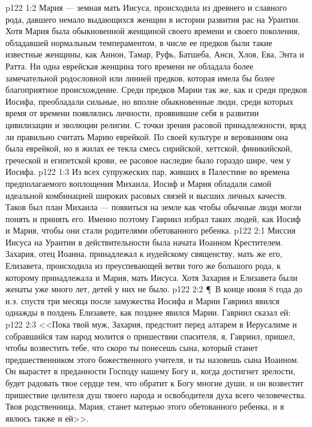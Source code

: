 \vs p122 1:2 Мария --- земная мать Иисуса, происходила из древнего и славного рода, давшего немало выдающихся женщин в истории развития рас на Урантии. Хотя Мария была обыкновенной женщиной своего времени и своего поколения, обладавшей нормальным темпераментом, в числе ее предков были такие известные женщины, как Аннон, Тамар, Руфь, Батшеба, Анси, Хлоя, Ева, Энта и Ратта. Ни одна еврейская женщина того времени не обладала более замечательной родословной или линией предков, которая имела бы более благоприятное происхождение. Среди предков Марии так же, как и среди предков Иосифа, преобладали сильные, но вполне обыкновенные люди, среди которых время от времени появлялись личности, проявившие себя в развитии цивилизации и эволюции религии. С точки зрения расовой принадлежности, вряд ли правильно считать Марию еврейкой. По своей культуре и верованиям она была еврейкой, но в жилах ее текла смесь сирийской, хеттской, финикийской, греческой и египетской крови, ее расовое наследие было гораздо шире, чем у Иосифа.
\vs p122 1:3 Из всех супружеских пар, живших в Палестине во времена предполагаемого воплощения Михаила, Иосиф и Мария обладали самой идеальной комбинацией широких расовых связей и высших личных качеств. Таков был план Михаила --- появиться на земле как  чтобы обычные люди могли понять и принять его. Именно поэтому Гавриил избрал таких людей, как Иосиф и Мария, чтобы они стали родителями обетованного ребенка.
\vs p122 2:1 Миссия Иисуса на Урантии в действительности была начата Иоанном Крестителем. Захария, отец Иоанна, принадлежал к иудейскому священству, мать же его, Елизавета, происходила из преуспевающей ветви того же большого рода, к которому принадлежала и Мария, мать Иисуса. Хотя Захария и Елизавета были женаты уже много лет, детей у них не было.
\vs p122 2:2 \P\ В конце июня 8 года до н.э. спустя три месяца после замужества Иосифа и Марии Гавриил явился однажды в полдень Елизавете, как позднее явился Марии. Гавриил сказал ей:
\vs p122 2:3 <<Пока твой муж, Захария, предстоит перед алтарем в Иерусалиме и собравшийся там народ молится о пришествии спасителя, я, Гавриил, пришел, чтобы возвестить тебе, что скоро ты понесешь сына, который станет предшественником этого божественного учителя, и ты назовешь сына Иоанном. Он вырастет в преданности Господу нашему Богу и, когда достигнет зрелости, будет радовать твое сердце тем, что обратит к Богу многие души, и он возвестит пришествие целителя душ твоего народа и освободителя духа всего человечества. Твоя родственница, Мария, станет матерью этого обетованного ребенка, и я явлюсь также и ей>>.
